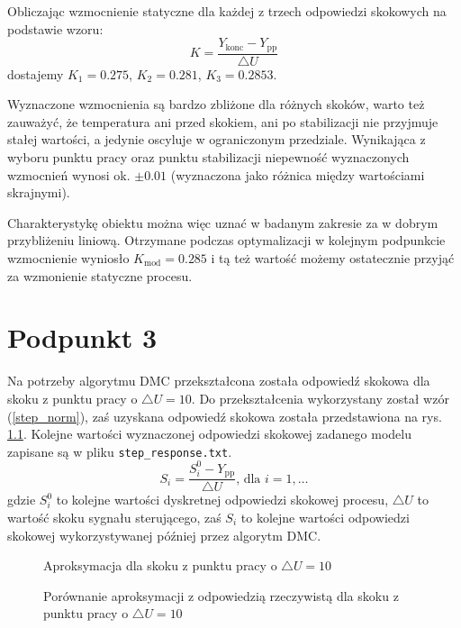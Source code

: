Obliczając wzmocnienie statyczne dla każdej z trzech odpowiedzi skokowych na podstawie wzoru:
\begin{equation}
 K=\frac{Y_{\mathrm{konc}}-Y_{\mathrm{pp}}}{\triangle U}
 \end{equation}
dostajemy $K_1=\num{0,275}$, $K_2=\num{0,281}$, $K_3=\num{0,2853}$.

Wyznaczone wzmocnienia są bardzo zbliżone dla różnych skoków, warto też zauważyć, że temperatura ani przed skokiem, ani po stabilizacji nie przyjmuje stałej wartości, a jedynie oscyluje w ograniczonym przedziale. Wynikająca z wyboru punktu pracy oraz punktu stabilizacji niepewność wyznaczonych wzmocnień wynosi ok. $\pm \num{0,01}$ (wyznaczona jako różnica między wartościami skrajnymi).

Charakterystykę obiektu można więc uznać w badanym zakresie za w dobrym przybliżeniu liniową. Otrzymane podczas optymalizacji w kolejnym podpunkcie wzmocnienie wyniosło $K_{\mathrm{mod}}=\num{0,285}$ i tą też wartość możemy ostatecznie przyjąć za wzmonienie statyczne procesu.


\chapter{Podpunkt 3}
Na potrzeby algorytmu DMC przekształcona została odpowiedź skokowa dla skoku z punktu pracy o $\triangle U = 10$. Do przekształcenia wykorzystany został wzór (\ref{step_norm}), zaś uzyskana odpowiedź skokowa została przedstawiona na rys. \ref{R2}. Kolejne wartości wyznaczonej odpowiedzi skokowej zadanego modelu zapisane są w pliku \verb+step_response.txt+.
\begin{equation}
S_i = \frac{S_i^0 - Y_{\mathrm{pp}}}{\triangle U} \textrm{, dla } i=1,\ldots
\label{step_norm}
\end{equation}
gdzie $S_i^0$ to kolejne wartości dyskretnej odpowiedzi skokowej procesu, $\triangle U$ to wartość skoku sygnału sterującego, zaś $S_i$ to kolejne wartości odpowiedzi skokowej wykorzystywanej później przez algorytm DMC.

\begin{figure}[ht]
\centering

\caption{Aproksymacja dla skoku z punktu pracy o $\triangle U = 10$}
\label{R2}
\end{figure}

\begin{figure}[ht]
\centering

\caption{Porównanie aproksymacji z odpowiedzią rzeczywistą dla skoku z punktu pracy o $\triangle U = 10$}
\label{R3}
\end{figure}

